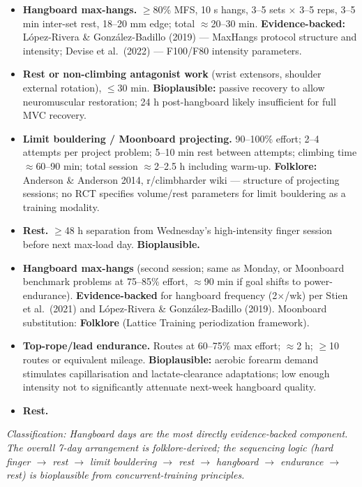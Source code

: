 \begin{itemize}[leftmargin=1.6cm,labelwidth=1.2cm,align=left]
  \item[\textbf{Mon:}] \textbf{Hangboard max-hangs.} $\geq$80\% MFS, 10 s hangs, 3–5 sets $\times$ 3–5 reps, 3–5 min inter-set rest, 18–20 mm edge; total $\approx$20–30 min. \textbf{Evidence-backed:} López-Rivera \& González-Badillo (2019) — MaxHangs protocol structure and intensity; Devise et al.\ (2022) — F100/F80 intensity parameters.
  \item[\textbf{Tue:}] \textbf{Rest or non-climbing antagonist work} (wrist extensors, shoulder external rotation), $\leq$30 min. \textbf{Bioplausible:} passive recovery to allow neuromuscular restoration; 24 h post-hangboard likely insufficient for full MVC recovery.
  \item[\textbf{Wed:}] \textbf{Limit bouldering / Moonboard projecting.} 90–100\% effort; 2–4 attempts per project problem; 5–10 min rest between attempts; climbing time $\approx$60–90 min; total session $\approx$2–2.5 h including warm-up. \textbf{Folklore:} Anderson \& Anderson 2014, r/climbharder wiki — structure of projecting sessions; no RCT specifies volume/rest parameters for limit bouldering as a training modality.
  \item[\textbf{Thu:}] \textbf{Rest.} $\geq$48 h separation from Wednesday's high-intensity finger session before next max-load day. \textbf{Bioplausible.}
  \item[\textbf{Fri:}] \textbf{Hangboard max-hangs} (second session; same as Monday, or Moonboard benchmark problems at 75–85\% effort, $\approx$90 min if goal shifts to power-endurance). \textbf{Evidence-backed} for hangboard frequency (2$\times$/wk) per Stien et al.\ (2021) and López-Rivera \& González-Badillo (2019). Moonboard substitution: \textbf{Folklore} (Lattice Training periodization framework).
  \item[\textbf{Sat:}] \textbf{Top-rope/lead endurance.} Routes at 60–75\% max effort; $\approx$2 h; $\geq$10 routes or equivalent mileage. \textbf{Bioplausible:} aerobic forearm demand stimulates capillarisation and lactate-clearance adaptations; low enough intensity not to significantly attenuate next-week hangboard quality.
  \item[\textbf{Sun:}] \textbf{Rest.}
\end{itemize}

\noindent\textit{Classification: Hangboard days are the most directly evidence-backed component. The overall 7-day arrangement is folklore-derived; the sequencing logic (hard finger $\to$ rest $\to$ limit bouldering $\to$ rest $\to$ hangboard $\to$ endurance $\to$ rest) is bioplausible from concurrent-training principles.}

